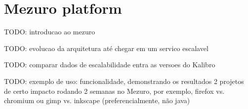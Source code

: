 \newpage
\section{Mezuro platform}
\label{sec:mezuro}

TODO: introducao ao mezuro

TODO: evolucao da arquitetura até chegar em um servico escalavel

TODO: comparar dados de escalabilidade entra as versoes do Kalibro

TODO: exemplo de uso: funcionalidade, demonstrando os resultados 2 projetos de
certo impacto rodando 2 semanas no Mezuro, por exemplo, firefox vs.  chromium
ou gimp vs. inkscape (preferencialmente, não java)





